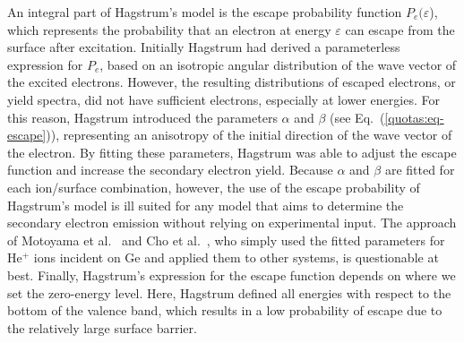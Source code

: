 \begin{refsection}
An integral part of Hagstrum's model is the escape probability function $P_e(\varepsilon$), which represents the probability that an electron at energy $\varepsilon$ can escape from the surface after excitation. Initially Hagstrum had derived a parameterless expression for $P_e$, based on an isotropic angular distribution of the wave vector of the excited electrons. However, the resulting distributions of escaped electrons, or yield spectra, did not have sufficient electrons, especially at lower energies. For this reason, Hagstrum introduced the parameters $\alpha$ and $\beta$ (see Eq.~(\ref{quotas:eq-escape})), representing an anisotropy of the initial direction of the wave vector of the electron. By fitting these parameters, Hagstrum was able to adjust the escape function and increase the secondary electron yield. Because $\alpha$ and $\beta$ are fitted for each ion/surface combination, however, the use of the escape probability of Hagstrum's model is ill suited for any model that aims to determine the secondary electron emission without relying on experimental input. The approach of Motoyama et al.~\cite{Motoyama2006} and Cho et al.~\cite{Cho2007}, who simply used the fitted parameters for He$^+$ ions incident on Ge and applied them to other systems, is questionable at best. Finally, Hagstrum's expression for the escape function depends on where we set the zero-energy level. Here, Hagstrum defined all energies with respect to the bottom of the valence band, which results in a low probability of escape due to the relatively large surface barrier.\\


\end{refsection}
